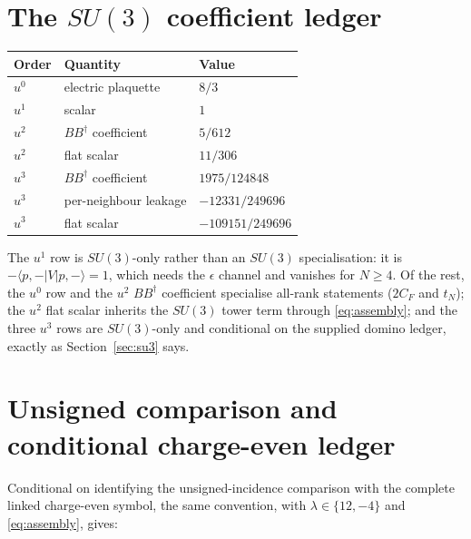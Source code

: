 \documentclass[11pt]{article}
\theoremstyle{plain}
\theoremstyle{definition}
\theoremstyle{remark}
\newcommand{\chk}[1]{}
\newcommand{\CF}{C_F}
\newcommand{\dg}{^{\dagger}}
\begin{document}
\section{The \texorpdfstring{$SU(3)$}{SU(3)} coefficient ledger}\label{app:ledger}

\begin{center}
\begin{tabular}{@{}lll@{}}
\toprule
Order & Quantity & Value\\
\midrule
$u^0$ & electric plaquette & $8/3$\\
$u^1$ & scalar & $1$\\
$u^2$ & $BB\dg$ coefficient & $5/612$\\
$u^2$ & flat scalar & $11/306$\\
$u^3$ & $BB\dg$ coefficient & $1975/124848$\\
$u^3$ & per-neighbour leakage & $-12331/249696$\\
$u^3$ & flat scalar & $-109151/249696$\\
\bottomrule
\end{tabular}
\end{center}
\chk{the manuscript's SU(3) ledger is this registry, value by value}

The $u^1$ row is $SU(3)$-only rather than an $SU(3)$ specialisation: it is
$-\langle p,-|V|p,-\rangle=1$, which needs the $\epsilon$ channel and vanishes
for $N\ge4$. Of the rest, the $u^0$ row and the $u^2$ $BB\dg$ coefficient
specialise all-rank statements ($2\CF$ and $t_N$); the $u^2$ flat scalar
inherits the $SU(3)$ tower term through \eqref{eq:assembly}; and the three
$u^3$ rows are $SU(3)$-only and conditional on the supplied domino ledger,
exactly as Section~\ref{sec:su3} says.

\section{Unsigned comparison and conditional charge-even ledger}\label{app:even}

Conditional on identifying the unsigned-incidence comparison with the complete
linked charge-even symbol, the same convention, with
$\lambda\in\{12,-4\}$ and \eqref{eq:assembly}, gives:
\end{document}

